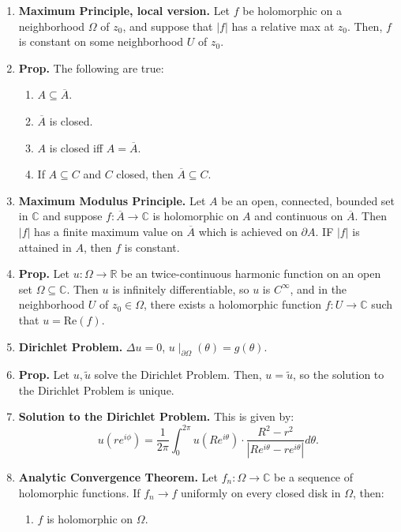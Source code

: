 \documentclass[12pt]{article}
\theoremstyle{definition}
\theoremstyle{named}
\begin{document}
{\begin{multicols}{2}
\begin{spacing}{1.01}
\begin{enumerate}
    \item \textbf{Maximum Principle, local version. } Let $f$ be holomorphic on a neighborhood $\Omega$ of $z_0$, and suppose that $|f|$ has a relative max at $z_0$. Then, $f$ is constant on some neighborhood $U$ of $z_0$. 
    \item \textbf{Prop. } The following are true: 
    \begin{enumerate}
        \item $A \subseteq \overline{A}$. 
        \item $\overline{A}$ is closed. 
        \item $A$ is closed iff $A = \overline{A}$. 
        \item If $A \subseteq C$ and $C$ closed, then $\overline{A} \subseteq C$. 
    \end{enumerate}
    \item \textbf{Maximum Modulus Principle. } Let $A$ be an open, connected, bounded set in $\mathbb{C}$ and suppose $f: \overline{A} \to \mathbb{C}$ is holomorphic on $A$ and continuous on $\overline{A}$. Then $|f|$ has a finite maximum value on $\overline{A}$ which is achieved on $\partial A$. IF $|f|$ is attained in $A$, then $f$ is constant. 
    \item \textbf{Prop. } Let $u: \Omega \to \mathbb{R}$ be an twice-continuous harmonic function on an open set $\Omega \subseteq \mathbb{C}$. Then $u$ is infinitely differentiable, so $u$ is $C^\infty$, and in the neighborhood $U$ of $z_0 \in \Omega$, there exists a holomorphic function $f: U \to \mathbb{C}$ such that $u = \textrm{Re}(f)$. 
    \item \textbf{Dirichlet Problem. } $\Delta u = 0$, $u \mid_{\partial \Omega} (\theta) = g(\theta)$. 
    \item \textbf{Prop. } Let $u,\tilde{u}$ solve the Dirichlet Problem. Then, $u = \tilde{u}$, so the solution to the Dirichlet Problem is unique. 
    \item \textbf{Solution to the Dirichlet Problem. } This is given by: 
    $$
    u(re^{i\phi}) = \frac{1}{2\pi} \int_{0}^{2\pi} u(Re^{i\theta}) \cdot \frac{R^2 - r^2}{|Re^{i\theta} - re^{i\theta}|} d\theta. 
    $$
    \item \textbf{Analytic Convergence Theorem. } Let $f_n: \Omega \to \mathbb{C}$ be a sequence of holomorphic functions. If $f_n \to f$ uniformly on every closed disk in $\Omega$, then: 
    \begin{enumerate}
        \item $f$ is holomorphic on $\Omega$. 

\end{enumerate}
\end{enumerate}
\end{spacing}
\end{multicols}}
\end{document}

